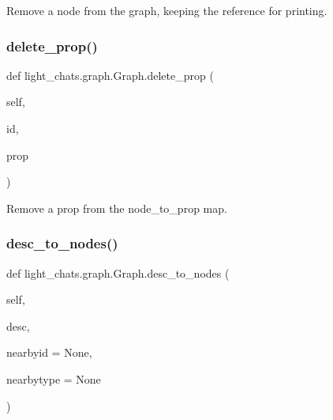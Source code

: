 \begin{DoxyVerb}Remove a node from the graph, keeping the reference for printing.
\end{DoxyVerb}
 \mbox{\label{classlight__chats_1_1graph_1_1Graph_ac98ed988f74d9571e195aa9592f84b76}} 
\subsubsection{\texorpdfstring{delete\+\_\+prop()}{delete\_prop()}}
{\footnotesize\ttfamily def light\+\_\+chats.\+graph.\+Graph.\+delete\+\_\+prop (\begin{DoxyParamCaption}\item[{}]{self,  }\item[{}]{id,  }\item[{}]{prop }\end{DoxyParamCaption})}

\begin{DoxyVerb}Remove a prop from the node_to_prop map.
\end{DoxyVerb}
 \mbox{\label{classlight__chats_1_1graph_1_1Graph_a67fd9624112a695cd6e1a0b92ec3139b}} 
\subsubsection{\texorpdfstring{desc\+\_\+to\+\_\+nodes()}{desc\_to\_nodes()}}
{\footnotesize\ttfamily def light\+\_\+chats.\+graph.\+Graph.\+desc\+\_\+to\+\_\+nodes (\begin{DoxyParamCaption}\item[{}]{self,  }\item[{}]{desc,  }\item[{}]{nearbyid = {\ttfamily None},  }\item[{}]{nearbytype = {\ttfamily None} }\end{DoxyParamCaption})}

